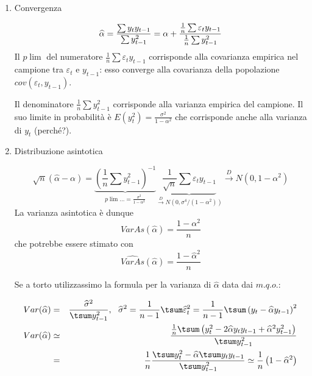 \documentclass[a4paper]{report}
\theoremstyle{remark}
\begin{document}
\begin{enumerate}
\item Convergenza

\begin{equation*}
\widehat{\alpha }=\frac{\sum y_{t}y_{t-1}}{\sum y_{t-1}^{2}}=\alpha +\frac{%
\frac{1}{n}\sum \varepsilon _{t}y_{t-1}}{\frac{1}{n}\sum y_{t-1}^{2}}
\end{equation*}%
Il $p\lim $ del numeratore $\frac{1}{n}\sum \varepsilon _{t}y_{t-1}$
corrisponde alla covarianza empirica nel campione tra $\varepsilon _{t}$ e $%
y_{t-1}$: esso converge alla covarianza della popolazione $cov(\varepsilon
_{t},y_{t-1})$.\vspace{0.5cm}

Il denominatore $\frac{1}{n}\sum y_{t-1}^{2}$ corrisponde alla varianza
empirica del campione. Il suo limite in probabilit\`{a} \`{e} $E(y_{t}^{2})=%
\frac{\sigma ^{2}}{1-\alpha ^{2}}$ che corrisponde anche alla varianza di $%
y_{t}$ (perch\'{e}?).

\item Distribuzione asintotica

\begin{equation*}
\sqrt{n}\left( \widehat{\alpha }-\alpha \right) =\underset{p\lim \ldots =%
\frac{\sigma ^{2}}{1-\alpha ^{2}}}{\underbrace{\left( \frac{1}{n}\sum
y_{t-1}^{2}\right) ^{-1}}}\underset{\overset{D}{\longrightarrow }N\left(
0,\sigma ^{4}/(1-\alpha ^{2})\right) }{\underbrace{\frac{1}{\sqrt{n}}\sum
\varepsilon _{t}y_{t-1}}}\overset{D}{\longrightarrow }N\left( 0,1-\alpha
^{2}\right)
\end{equation*}%
La varianza asintotica \`{e} dunque%
\begin{equation*}
VarAs\left( \widehat{\alpha }\right) =\frac{1-\alpha ^{2}}{n}
\end{equation*}%
che potrebbe essere stimato con 
\begin{equation*}
\widehat{VarAs}\left( \widehat{\alpha }\right) =\frac{1-\widehat{\alpha }^{2}%
}{n}
\end{equation*}

Se a torto utilizzassimo la formula per la varianza di $\widehat{\alpha }$
data dai $m.q.o.$:

\begin{eqnarray*}
Var(\widehat{\alpha }) &=&\frac{\widehat{\sigma }^{2}}{\tsum y_{t-1}^{2}},\
\ \widehat{\sigma }^{2}=\frac{1}{n-1}\tsum \widehat{\varepsilon }_{t}^{2}=%
\frac{1}{n-1}\tsum \left( y_{t}-\widehat{\alpha }y_{t-1}\right) ^{2} \\
Var(\widehat{\alpha }) &\simeq &\frac{\frac{1}{n}\tsum \left( y_{t}^{2}-2%
\widehat{\alpha }y_{t}y_{t-1}+\widehat{\alpha }^{2}y_{t-1}^{2}\right) }{%
\tsum y_{t-1}^{2}} \\
&=&\frac{1}{n}\frac{\tsum y_{t}^{2}-\widehat{\alpha }\tsum y_{t}y_{t-1}}{%
\tsum y_{t-1}^{2}}\simeq \frac{1}{n}\left( 1-\widehat{\alpha }^{2}\right)
\end{eqnarray*}
\end{enumerate}
\end{document}
